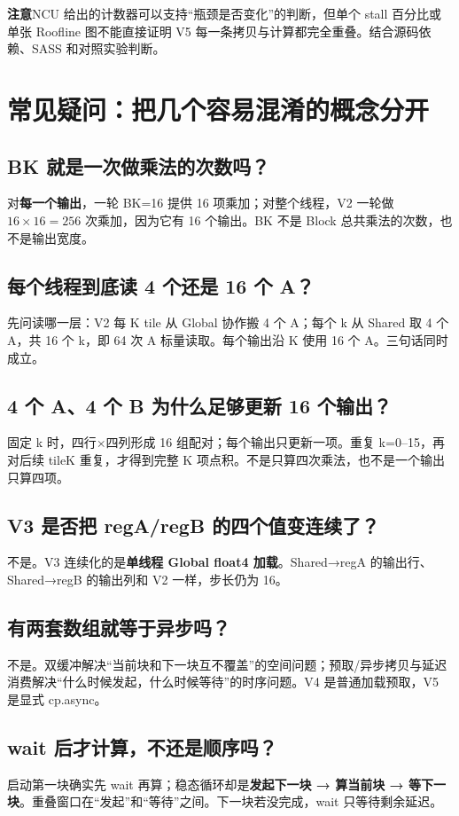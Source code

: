 \documentclass[UTF8,11pt,a4paper,fontset=fandol]{ctexart}
\newcommand{\caution}[1]{\par\noindent\colorbox{PaleOrange}{\parbox{\dimexpr\linewidth-2\fboxsep\relax}{\textbf{注意}\quad #1}}\par}
\newcommand{\pagebreakhere}{\clearpage}
\begin{document}
\caution{NCU 给出的计数器可以支持“瓶颈是否变化”的判断，但单个 stall 百分比或单张 Roofline 图不能直接证明 V5 每一条拷贝与计算都完全重叠。结合源码依赖、SASS 和对照实验判断。}
\pagebreakhere

\section{常见疑问：把几个容易混淆的概念分开}
\subsection*{BK 就是一次做乘法的次数吗？}
对\textbf{每一个输出}，一轮 BK=16 提供 16 项乘加；对整个线程，V2 一轮做 $16\times16=256$ 次乘加，因为它有 16 个输出。BK 不是 Block 总共乘法的次数，也不是输出宽度。

\subsection*{每个线程到底读 4 个还是 16 个 A？}
先问读哪一层：V2 每 K tile 从 Global 协作搬 4 个 A；每个 k 从 Shared 取 4 个 A，共 16 个 k，即 64 次 A 标量读取。每个输出沿 K 使用 16 个 A。三句话同时成立。

\subsection*{4 个 A、4 个 B 为什么足够更新 16 个输出？}
固定 k 时，四行×四列形成 16 组配对；每个输出只更新一项。重复 k=0--15，再对后续 tileK 重复，才得到完整 K 项点积。不是只算四次乘法，也不是一个输出只算四项。

\subsection*{V3 是否把 regA/regB 的四个值变连续了？}
不是。V3 连续化的是\textbf{单线程 Global float4 加载}。Shared→regA 的输出行、Shared→regB 的输出列和 V2 一样，步长仍为 16。

\subsection*{有两套数组就等于异步吗？}
不是。双缓冲解决“当前块和下一块互不覆盖”的空间问题；预取/异步拷贝与延迟消费解决“什么时候发起，什么时候等待”的时序问题。V4 是普通加载预取，V5 是显式 cp.async。

\subsection*{wait 后才计算，不还是顺序吗？}
启动第一块确实先 wait 再算；稳态循环却是\textbf{发起下一块 → 算当前块 → 等下一块}。重叠窗口在“发起”和“等待”之间。下一块若没完成，wait 只等待剩余延迟。
\end{document}

